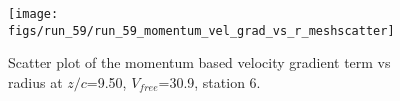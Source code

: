 \begin{figure}[H]
\centering
\texttt{[image: figs/run\_59/run\_59\_momentum\_vel\_grad\_vs\_r\_meshscatter]}
\caption{Scatter plot of the momentum based velocity gradient term vs radius at $z/c$=9.50, $V_{free}$=30.9, station 6.}
\label{fig:run_59_momentum_vel_grad_vs_r_meshscatter}
\end{figure}


